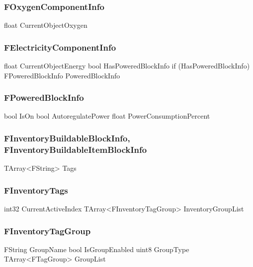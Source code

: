 \subsubsection{FOxygenComponentInfo}
\begin{code}
float                                       CurrentObjectOxygen
\end{code}


\subsubsection{FElectricityComponentInfo}
\begin{code}
float                                       CurrentObjectEnergy
bool                                        HasPoweredBlockInfo
if (HasPoweredBlockInfo)
    FPoweredBlockInfo                       PoweredBlockInfo
\end{code}

\subsubsection{FPoweredBlockInfo}
\begin{code}
bool                                        IsOn
bool                                        AutoregulatePower
float                                       PowerConsumptionPercent
\end{code}



\subsubsection{FInventoryBuildableBlockInfo, FInventoryBuildableItemBlockInfo}
\begin{code}
TArray<FString>                             Tags
\end{code}

\newpage


\subsubsection{FInventoryTags}
\begin{code}
int32                                       CurrentActiveIndex
TArray<FInventoryTagGroup>                  InventoryGroupList
\end{code}

\subsubsection{FInventoryTagGroup}
\begin{code}
FString                                     GroupName
bool                                        IsGroupEnabled
uint8                                       GroupType
TArray<FTagGroup>                           GroupList
\end{code}

